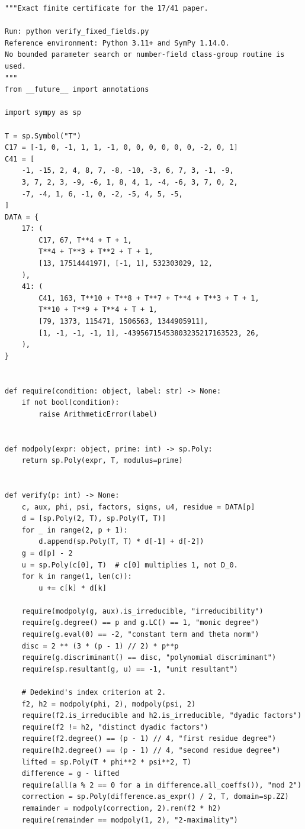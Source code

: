 \documentclass[11pt,a4paper]{article}
\begin{document}
\begin{verbatim}
"""Exact finite certificate for the 17/41 paper.

Run: python verify_fixed_fields.py
Reference environment: Python 3.11+ and SymPy 1.14.0.
No bounded parameter search or number-field class-group routine is used.
"""
from __future__ import annotations

import sympy as sp

T = sp.Symbol("T")
C17 = [-1, 0, -1, 1, 1, -1, 0, 0, 0, 0, 0, 0, -2, 0, 1]
C41 = [
    -1, -15, 2, 4, 8, 7, -8, -10, -3, 6, 7, 3, -1, -9,
    3, 7, 2, 3, -9, -6, 1, 8, 4, 1, -4, -6, 3, 7, 0, 2,
    -7, -4, 1, 6, -1, 0, -2, -5, 4, 5, -5,
]
DATA = {
    17: (
        C17, 67, T**4 + T + 1,
        T**4 + T**3 + T**2 + T + 1,
        [13, 1751444197], [-1, 1], 532303029, 12,
    ),
    41: (
        C41, 163, T**10 + T**8 + T**7 + T**4 + T**3 + T + 1,
        T**10 + T**9 + T**4 + T + 1,
        [79, 1373, 115471, 1506563, 1344905911],
        [1, -1, -1, -1, 1], -43956715453803235217163523, 26,
    ),
}


def require(condition: object, label: str) -> None:
    if not bool(condition):
        raise ArithmeticError(label)


def modpoly(expr: object, prime: int) -> sp.Poly:
    return sp.Poly(expr, T, modulus=prime)


def verify(p: int) -> None:
    c, aux, phi, psi, factors, signs, u4, residue = DATA[p]
    d = [sp.Poly(2, T), sp.Poly(T, T)]
    for _ in range(2, p + 1):
        d.append(sp.Poly(T, T) * d[-1] + d[-2])
    g = d[p] - 2
    u = sp.Poly(c[0], T)  # c[0] multiplies 1, not D_0.
    for k in range(1, len(c)):
        u += c[k] * d[k]

    require(modpoly(g, aux).is_irreducible, "irreducibility")
    require(g.degree() == p and g.LC() == 1, "monic degree")
    require(g.eval(0) == -2, "constant term and theta norm")
    disc = 2 ** (3 * (p - 1) // 2) * p**p
    require(g.discriminant() == disc, "polynomial discriminant")
    require(sp.resultant(g, u) == -1, "unit resultant")

    # Dedekind's index criterion at 2.
    f2, h2 = modpoly(phi, 2), modpoly(psi, 2)
    require(f2.is_irreducible and h2.is_irreducible, "dyadic factors")
    require(f2 != h2, "distinct dyadic factors")
    require(f2.degree() == (p - 1) // 4, "first residue degree")
    require(h2.degree() == (p - 1) // 4, "second residue degree")
    lifted = sp.Poly(T * phi**2 * psi**2, T)
    difference = g - lifted
    require(all(a % 2 == 0 for a in difference.all_coeffs()), "mod 2")
    correction = sp.Poly(difference.as_expr() / 2, T, domain=sp.ZZ)
    remainder = modpoly(correction, 2).rem(f2 * h2)
    require(remainder == modpoly(1, 2), "2-maximality")


\end{verbatim}
\end{document}
